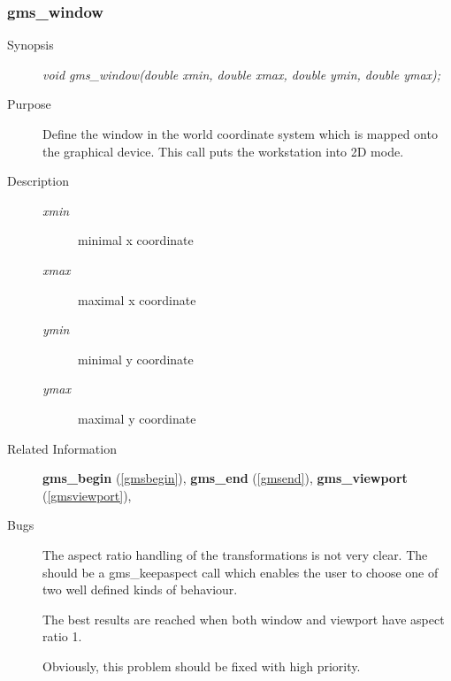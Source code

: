 \subsubsection{gms\_window\label{gmswindow}}
\begin{description}
\item[Synopsis]\mbox{}


{\em  void    gms\_window(double xmin,
double xmax,
double ymin,
double ymax);\/}
\item[Purpose]\mbox{}


Define the window in  the world coordinate system 
which is mapped onto the graphical device.
This call puts the workstation into 2D mode.



\item[Description]\mbox{}


\begin{description}
\item[{\em xmin\/}]\mbox{}

 minimal x coordinate
\item[{\em xmax\/}]\mbox{}

 maximal x coordinate
\item[{\em ymin\/}]\mbox{}

 minimal y coordinate
\item[{\em ymax\/}]\mbox{}

 maximal y coordinate
\end{description}

\item[Related Information]\mbox{}


{\bf gms\_begin} (\ref{gmsbegin}), 
{\bf gms\_end} (\ref{gmsend}), 
{\bf gms\_viewport} (\ref{gmsviewport}), 
\item[Bugs]\mbox{}


The aspect ratio handling of the transformations is not very clear.
The should be a gms\_keepaspect call which enables the user
to choose one of two well defined kinds of behaviour.
 
The best results are reached when both window and viewport have
aspect ratio 1.

 Obviously, this problem should be fixed with high priority.

\end{description}



\newpage



